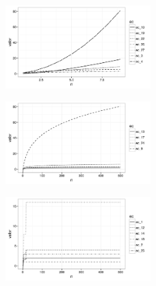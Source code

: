 \documentclass{article}
\begin{document}
\begin{figure}[H]
\centering
\includegraphics[width=0.5\textwidth]{img/graf_05.png}
\end{figure}

\begin{figure}[H]
\centering
\includegraphics[width=0.5\textwidth]{img/graf_06.png}
\end{figure}

\begin{figure}[H]
\centering
\includegraphics[width=0.5\textwidth]{img/graf_07.png}
\end{figure}
\end{document}
